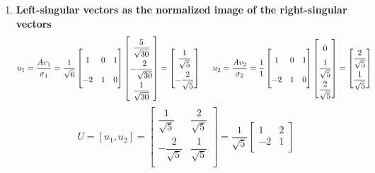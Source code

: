 \begin{enumerate}
    \vspace{0.5cm}
    \item \textbf{Left-singular vectors as the normalized image of the right-singular vectors}
    \[
        \hfill
        \renewcommand{\arraystretch}{2}
        u_1 = \dfrac{Av_1}{\sigma_1} = \dfrac{1}{\sqrt{6}} 
        \begin{bmatrix}
            1 & 0 & 1 \\
            -2 & 1 & 0 \\
        \end{bmatrix}
        \begin{bmatrix}
            \dfrac{5}{\sqrt{30}} \\
            -\dfrac{2}{\sqrt{30}} \\
            \dfrac{1}{\sqrt{30}} \\
        \end{bmatrix}
        = 
        \begin{bmatrix}
            \dfrac{1}{\sqrt{5}} \\
            -\dfrac{2}{\sqrt{5}}
        \end{bmatrix}
        \hspace{0.5cm}
        \renewcommand{\arraystretch}{2}
        u_2 = \dfrac{Av_2}{\sigma_2} = \dfrac{1}{1} 
        \begin{bmatrix}
            1 & 0 & 1 \\
            -2 & 1 & 0 \\
        \end{bmatrix}
        \begin{bmatrix}
            0 \\
            \dfrac{1}{\sqrt{5}} \\
            \dfrac{2}{\sqrt{5}} \\
        \end{bmatrix}
        = 
        \begin{bmatrix}
            \dfrac{2}{\sqrt{5}} \\
            \dfrac{1}{\sqrt{5}}
        \end{bmatrix}
        \hfill
    \]
    \[
        \renewcommand{\arraystretch}{2}
        U = [u_1, u_2] = 
        \begin{bmatrix}
            \dfrac{1}{\sqrt{5}} & \dfrac{2}{\sqrt{5}} \\
            -\dfrac{2}{\sqrt{5}} & \dfrac{1}{\sqrt{5}} \\
        \end{bmatrix}
        = 
        \dfrac{1}{\sqrt{5}}
        \begin{bmatrix}
            1 & {2} \\
            -{2} & {1} \\
        \end{bmatrix}
    \]
    
\end{enumerate}


